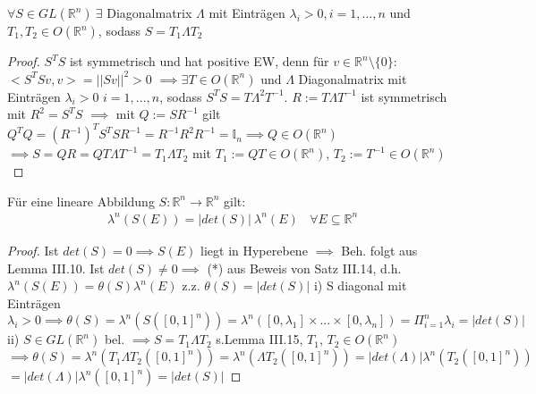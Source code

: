   \begin{lemma}[Polarzerlegung]
    $\forall S \in GL(\mathbb{R}^n) \ \exists$ Diagonalmatrix $\Lambda$ mit Einträgen $\lambda_i > 0, i=1,...,n$ und \\
    $T_1, T_2 \in O(\mathbb{R}^n)$, sodass $S = T_1 \Lambda T_2$ 
  \end{lemma}

    \begin{proof}
	$S^T S$ ist symmetrisch und hat positive EW, denn für \newline $v\in\mathbb{R}^n\setminus\{0\}:$ $<S^T Sv,v > = ||Sv||^2 > 0$ \newline
	$\implies \exists T\in O(\mathbb{R}^n)$ und $\Lambda$ Diagonalmatrix mit Einträgen $\lambda_i > 0$ $i=1,...,n$, sodass $S^T S = T \Lambda^2 T^{-1}$. \newline
	$R := T \Lambda T^{-1}$ ist symmetrisch mit $R^2 = S^T S$ $\implies$ mit $Q := S R^{-1}$ gilt \newline
	$Q^T Q = (R^{-1})^T S^T S R^{-1} = R^{-1} R^2 R^{-1} = \mathbb{I}_n \implies Q \in O(\mathbb{R}^n)$ \newline
	$\implies S = Q R = Q T \Lambda T^{-1} = T_1 \Lambda T_2$ mit $T_1 := Q T \in O(\mathbb{R}^n)$, $T_2 := T^{-1} \in O(\mathbb{R}^n)$
	\end{proof}

  \begin{theorem}
    Für eine lineare Abbildung $S: \mathbb{R}^n \to \mathbb{R}^n$ gilt:
    \begin{align*}
      \lambda^n(S(E)) = |det(S)| \ \lambda^n(E) \ \ \ \ \forall E \subseteq \mathbb{R}^n
    \end{align*}
  \end{theorem}

    \begin{proof}
	Ist $det(S) = 0 \implies S(E)$ liegt in Hyperebene $\implies$ Beh. folgt aus Lemma III.10. \newline
	Ist $det(S) \neq 0 \implies$ (*) aus Beweis von Satz III.14, d.h. $\lambda^n(S(E)) = \theta(S) \lambda^n(E)$ \newline
	z.z. $\theta(S) = |det(S)|$ \newline
	i) S diagonal mit Einträgen $\lambda_i > 0 \implies \theta(S) = \lambda^n(S([0,1]^n)) = \lambda^n([0,\lambda_1]\times ... \times [0,\lambda_n])= \Pi_{i=1}^{n} \lambda_i = |det(S)|$ \newline 
	ii) $S\in GL(\mathbb{R}^n)$ bel. $\implies S = T_1 \Lambda T_2$ s.Lemma III.15, $T_1$, $T_2 \in O(\mathbb{R}^n)$ \newline
	$\implies \theta(S) = \lambda^n(T_1\Lambda T_2([0,1]^n)) = \lambda^n(\Lambda T_2([0,1]^n)) = |det(\Lambda)| \lambda^n(T_2([0,1]^n))$ \newline $= |det(\Lambda)| \lambda^n([0,1]^n) = |det(S)|$
	\end{proof}

